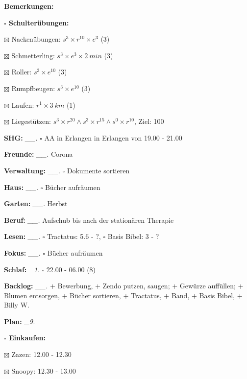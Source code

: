 \documentclass[10pt,a4paper]{article}
\newcommand\prop[1] {{\color {alizarin} {\bf #1}}}             %
\newcommand\mand[1] {{\color {burntorange} {\bf #1}}}          %
\newcommand\topspace{\vskip -15pt \hskip 20pt}
\newcommand\bottomspace{\vskip 4pt}
\newcommand\n[1] { {\sl #1.} \hskip 5pt }
\begin{document}
\begin{mdframed}[style=daystyle]
\begin{labeling}{{\mand {Bemerkungen:}}}
\begin{minipage}{0.75\textwidth}
\begin{labeling}{\prop {$\square$ {Schulterübungen:}}}
      \item[$\boxtimes$ Nackenübungen:]   $s^3 \times r^{10} \times e^3$ (3)
      \item[$\boxtimes$ Schmetterling:]   $s^3 \times e^3 \times 2\ min$ (3)
      \item[$\boxtimes$ Roller:]          $s^3 \times e^{10}$ (3)
      \item[$\boxtimes$ Rumpfbeugen:]     $s^3 \times e^{10}$ (3)
      \item[$\boxtimes$ Laufen:]          $r^1 \times 3\ km$ (1)
      \item[$\boxtimes$ Liegestützen:]    $s^3 \times r^{20} \land s^3 \times r^{15} \land s^0 \times r^{10}$, Ziel: 100
      \end{labeling}
    \end{minipage}
    \bottomspace        
  \item[{\mand {SHG:}}]          \n{\_\_} $\square$ AA in Erlangen in Erlangen von 19.00 - 21.00
  \item[{\mand {Freunde:}}]      \n{\_\_} Corona
  \item[{\mand {Verwaltung:}}]   \n{\_\_} $\square$ Dokumente sortieren
  \item[{\mand {Haus:}}]         \n{\_\_} $\square$ Bücher aufräumen
  \item[{\mand {Garten:}}]       \n{\_\_} Herbst
  \item[{\mand {Beruf:}}]        \n{\_\_} Aufschub bis nach der stationären Therapie
  \item[{\mand {Lesen:}}]        \n{\_\_} $\square$ Tractatus: 5.6 - ?, $\square$ Basis Bibel: 3 - ?
  \item[{\mand {Fokus:}}]        \n{\_\_} $\square$ Bücher aufräumen
  \item[{\mand {Schlaf:}}]        \n{\_1} $\square$ 22.00 - 06.00 (8)
  \item[{\mand {Backlog:}}]      \n{\_\_} 
    $+$ Bewerbung,
    $+$ Zendo putzen, saugen; $+$ Gewürze auffüllen; $+$ Blumen entsorgen, $+$ Bücher sortieren,
    $+$ Tractatus, $+$ Band, $+$ Basis Bibel, $+$ Billy W.  
  \item[{\mand {Plan:}}]          \n{\_9}
    \topspace
    \begin{minipage}{0.75\textwidth}  
      \begin{labeling}{\prop {$\square$ {Einkaufen:}}} 
        \setlength\itemsep{-3pt}
      \item[$\boxtimes$ Zazen:]     12.00 - 12.30
      \item[$\boxtimes$ Snoopy:]    12.30 - 13.00

\end{labeling}
\end{minipage}
\end{labeling}
\end{mdframed}
\end{document}
